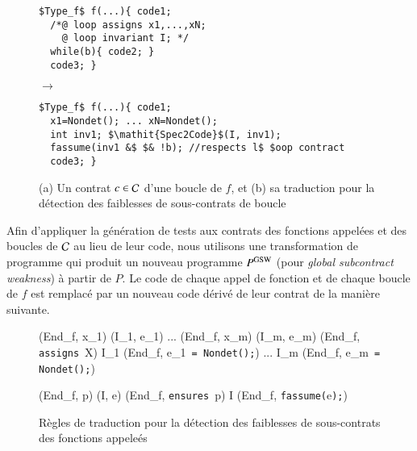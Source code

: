 \begin{figure*}[tb]
\begin{center}
\begin{minipage}{0.35\columnwidth}
\begin{lstlisting}[mathescape]
$Type_f$ f(...){ code1;
  /*@ loop assigns x1,...,xN;
    @ loop invariant I; */
  while(b){ code2; }
  code3; }
\end{lstlisting}
\end{minipage}
\hspace{-6mm}
\begin{minipage}{0.07\columnwidth}$\to$\end{minipage}
\begin{minipage}{0.55\columnwidth}
\begin{lstlisting}[mathescape]
$Type_f$ f(...){ code1;
  x1=Nondet(); ... xN=Nondet();
  int inv1; $\mathit{Spec2Code}$(I, inv1);
  fassume(inv1 &$ $& !b); //respects l$ $oop contract
  code3; }
\end{lstlisting}
\end{minipage}
\vspace{-3mm}
\caption{(a) Un contrat $c\in{\ensuremath\mathcal{C}}$ d'une boucle de $f$, et
(b) sa traduction pour la détection des faiblesses de sous-contrats de boucle}
\vspace{-3mm}
\label{fig:CW-transf-loops}
\end{center}
\end{figure*}

Afin d'appliquer la génération de tests aux contrats des fonctions appelées et
des boucles de ${\mathcal{C}}$ au lieu de leur code, nous utilisons une transformation de
programme qui produit un nouveau programme $P^{\mathrm{GSW}}$ (pour {\em global
subcontract weakness}) à partir de $P$.
Le code de chaque appel de fonction et de chaque boucle de $f$ est remplacé
par un nouveau code dérivé de leur contrat de la manière suivante.

\begin{figure}[tb]
  \scriptsize{
    {
      {
        (End_f, x_1) \trule (I_1, e_1) \quad
        ... \quad
        (End_f, x_m) \trule (I_m, e_m)
      }
      {
        (End_f, \mbox{\lstinline'assigns'}~X\semicolon) \arule
        I_1 \concat (End_f, e_1~\mbox{\lstinline'= Nondet();'})
        \concat ...
        \concat I_m \concat (End_f, e_m~\mbox{\lstinline'= Nondet();'})
      }{}
    }

    {
      {(End_f, p) \prule (I, e)}
      {(End_f, \mbox{\lstinline'ensures'}~p\semicolon)
        \arule
        I \concat (End_f, \mbox{\lstinline'fassume('}e\mbox{\lstinline');'})}{}
    }
  }
  \caption{Règles de traduction pour la détection des faiblesses de
    sous-contrats des fonctions appeleés}
  \label{fig:assume-annot}
\end{figure}

